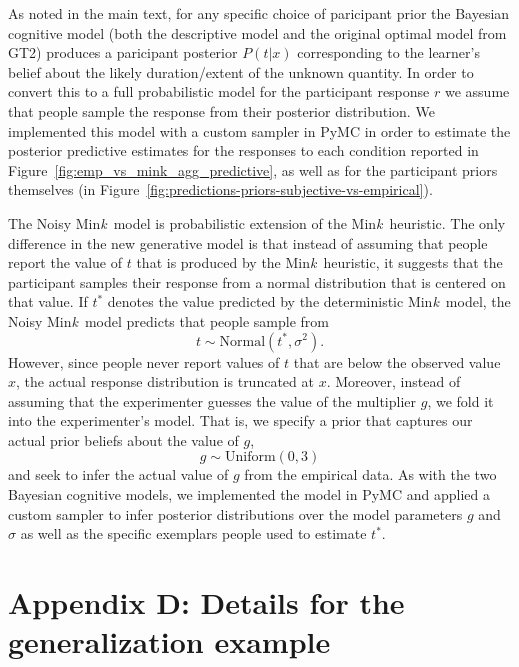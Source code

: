 \documentclass[doc,floatsintext]{apa6}
\newcommand{\mink}{{Min\textit{k}\ }}
\begin{document}
As noted in the main text, for any specific choice of paricipant prior the Bayesian cognitive model (both the descriptive model and the original optimal model from GT2) produces a paricipant posterior $P(t|x)$ corresponding to the learner's belief about the likely duration/extent of the unknown quantity. In order to convert this to a full probabilistic model for the participant response $r$ we assume that people sample the response from their posterior distribution. We implemented this model with a custom sampler in PyMC in order to estimate the posterior predictive estimates for the responses to each condition reported in Figure~\ref{fig:emp_vs_mink_agg_predictive}, as well as for the participant priors themselves (in Figure~\ref{fig:predictions-priors-subjective-vs-empirical}).

The Noisy \mink model is probabilistic extension of the \mink heuristic. The only difference in the new generative model is that instead of assuming that people report the value of $t$ that is produced by the \mink heuristic, it suggests that the participant samples their response from a normal distribution that is centered on that value. If $t^*$ denotes the value predicted by the deterministic \mink model, the Noisy \mink model predicts that people sample from
\begin{equation}
t \sim \mbox{Normal}(t^*,\sigma^2).
\end{equation}
However, since people never report values of $t$ that are below the observed value $x$, the actual response distribution is truncated at $x$. Moreover, instead of assuming that the experimenter guesses the value of the multiplier $g$, we fold it into the experimenter's model. That is, we specify a prior that captures our actual prior beliefs about the value of $g$,
\begin{equation}
g \sim \mathrm{Uniform}(0,3)
\end{equation}
and seek to infer the actual value of $g$ from the empirical data. As with the two Bayesian cognitive models, we implemented the model in PyMC and applied a custom sampler to infer posterior distributions over the model parameters $g$ and $\sigma$ as well as the specific exemplars people used to estimate $t^*$.

\section{Appendix D: Details for the generalization example}
\end{document}
